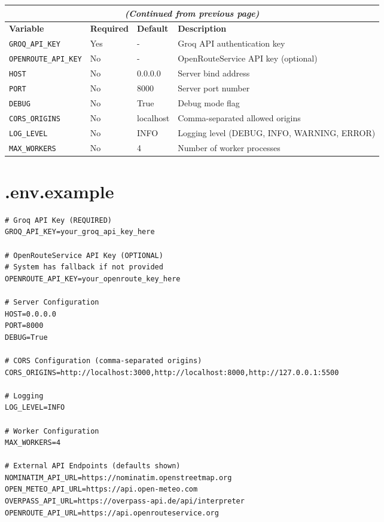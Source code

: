 \documentclass[12pt,a4paper]{report}
\newcommand{\code}[1]{\texttt{#1}}
\begin{document}
\begin{figure}[H]
\begin{plantuml}
\begin{figure}[H]
\begin{plantuml}
\begin{longtable}{|l|l|l|p{5cm}|}
\multicolumn{4}{c}{\textit{(Continued from previous page)}} \\
\hline
\textbf{Variable} & \textbf{Required} & \textbf{Default} & \textbf{Description} \\
\hline
\endhead

\hline
\endlastfoot

\code{GROQ\_API\_KEY} & Yes & - & Groq API authentication key \\
\hline
\code{OPENROUTE\_API\_KEY} & No & - & OpenRouteService API key (optional) \\
\hline
\code{HOST} & No & 0.0.0.0 & Server bind address \\
\hline
\code{PORT} & No & 8000 & Server port number \\
\hline
\code{DEBUG} & No & True & Debug mode flag \\
\hline
\code{CORS\_ORIGINS} & No & localhost & Comma-separated allowed origins \\
\hline
\code{LOG\_LEVEL} & No & INFO & Logging level (DEBUG, INFO, WARNING, ERROR) \\
\hline
\code{MAX\_WORKERS} & No & 4 & Number of worker processes \\
\hline
\end{longtable}

\section{.env.example}

\begin{lstlisting}[style=bashStyle, caption={.env.example Template}]
# Groq API Key (REQUIRED)
GROQ_API_KEY=your_groq_api_key_here

# OpenRouteService API Key (OPTIONAL)
# System has fallback if not provided
OPENROUTE_API_KEY=your_openroute_key_here

# Server Configuration
HOST=0.0.0.0
PORT=8000
DEBUG=True

# CORS Configuration (comma-separated origins)
CORS_ORIGINS=http://localhost:3000,http://localhost:8000,http://127.0.0.1:5500

# Logging
LOG_LEVEL=INFO

# Worker Configuration
MAX_WORKERS=4

# External API Endpoints (defaults shown)
NOMINATIM_API_URL=https://nominatim.openstreetmap.org
OPEN_METEO_API_URL=https://api.open-meteo.com
OVERPASS_API_URL=https://overpass-api.de/api/interpreter
OPENROUTE_API_URL=https://api.openrouteservice.org


\end{lstlisting}
\end{plantuml}
\end{figure}
\end{plantuml}
\end{figure}
\end{document}

